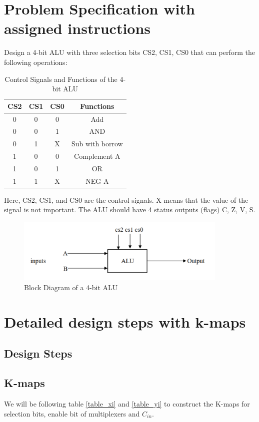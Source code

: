 \documentclass[11pt]{article}
\begin{document}
\section{Problem Specification with assigned instructions}
Design a 4-bit ALU with three selection bits CS2, CS1, CS0 that can perform the following operations:
\begin{table}[ht]
    \centering
    \begin{tabular}{|c|c|c|c|}
        \hline
        \textbf{CS2} & \textbf{CS1} & \textbf{CS0} & \textbf{Functions} \\
        \hline
        0 & 0 & 0 & Add \\
        \hline
        0 & 0 & 1 & AND \\
        \hline
        0 & 1 & X & Sub with borrow \\
        \hline
        1 & 0 & 0 & Complement A \\
        \hline
        1 & 0 & 1 & OR \\
        \hline
        1 & 1 & X & NEG A \\
        \hline
    \end{tabular}
    \caption{Control Signals and Functions of the 4-bit ALU}
\end{table}

Here, CS2, CS1, and CS0 are the control signals. X means that the value of the signal is not important. The ALU should have 4 status outputs (flags) C, Z, V, S.
\begin{figure}[ht]
    \centering
    \includegraphics[width=0.9\textwidth]{images/ALU2.png}
    \caption{Block Diagram of a 4-bit ALU}
\end{figure}

\section{Detailed design steps with k-maps}
\subsection{Design Steps}
\subsection{K-maps}
We will be following table \ref{table_xi} and \ref{table_yi} to construct the K-maps for selection bits, enable bit of multiplexers and $C_{in}$.
\end{document}
